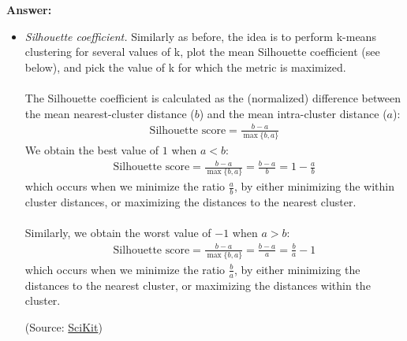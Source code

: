 \documentclass{article}
\newenvironment{QandA}{\begin{enumerate}[label=\arabic*.]}{\end{enumerate}}
\newenvironment{InnerQandA}{\begin{enumerate}[label=\roman*.]}{\end{enumerate}}
\newenvironment{answer}{\par\normalfont \textbf{Answer:}}{}
\begin{document}
\begin{QandA}
\begin{InnerQandA}
\begin{answer}
\begin{itemize}
                \item \textit{Silhouette coefficient.} Similarly as before, the idea is to perform k-means clustering for several values of k, plot the mean Silhouette coefficient (see below), and pick the value of k for which the metric is maximized. \\\\
                The Silhouette coefficient is calculated as the (normalized) difference between the mean nearest-cluster distance ($b$) and the mean intra-cluster distance ($a$):
                \begin{align*}
                    \text{Silhouette score} = \frac{b-a}{\max\{b, a\}}
                \end{align*}
                We obtain the best value of $1$ when $a < b$:
                \begin{align*}
                    \text{Silhouette score} = \frac{b-a}{\max\{b, a\}} = \frac{b-a}{b} = 1 - \frac{a}{b}
                \end{align*}
                which occurs when we minimize the ratio $\frac{a}{b}$, by either minimizing the within cluster distances, or maximizing the distances to the nearest cluster. \\\\
                Similarly, we obtain the worst value of $-1$ when $a > b$:
                \begin{align*}
                    \text{Silhouette score} = \frac{b-a}{\max\{b, a\}} = \frac{b-a}{a} = \frac{b}{a}-1
                \end{align*}
                which occurs when we minimize the ratio $\frac{b}{a}$, by either minimizing the distances to the nearest cluster, or maximizing the distances within the cluster.

                (Source: \href{https://scikit-learn.org/stable/modules/generated/sklearn.metrics.silhouette_score.html}{SciKit})
            \end{itemize}
        \end{answer}


\end{InnerQandA}
\end{QandA}
\end{document}
